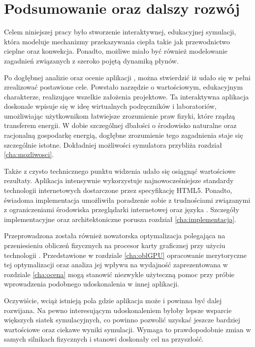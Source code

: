 \chapter{Podsumowanie oraz dalszy rozwój}

Celem niniejszej pracy było stworzenie interaktywnej, edukacyjnej symulacji,
która modeluje mechanizmy przekazywania ciepła takie jak przewodnictwo cieplne
oraz konwekcja. Ponadto, możliwe miało być również modelowanie zagadnień
związanych z szeroko pojętą dynamiką płynów.

Po dogłębnej analizie oraz ocenie aplikacji \en, można stwierdzić iż udało się w
pełni zrealizować postawione cele. Powstało narzędzie o wartościowym,
edukacyjnym charakterze, realizujące wszelkie założenia projektowe. Ta
interaktywna aplikacja doskonale wpisuje się w ideę wirtualnych podręczników i
laboratoriów, umożliwiając użytkownikom łatwiejsze zrozumienie praw fizyki,
które rządzą transferem energii. W dobie szczególnej dbałości o środowisko
naturalne oraz racjonalną gospodarkę energią, dogłębne zrozumienie tego
zagadnienia staje się szczególnie istotne. Dokładniej możliwości symulatora
przybliża rozdział \ref{cha:mozliwosci}.

Także z czysto technicznego punktu widzenia udało się osiągnąć wartościowe
rezultaty. Aplikacja intensywnie wykorzystuje najnowocześniejsze standardy
technologii internetowych dostarczone przez specyfikację HTML5. Ponadto,
świadoma implementacja umożliwiła poradzenie sobie z trudnościami związanymi z
ograniczeniami środowiska przeglądarki internetowej oraz języka \js. Szczegóły
implementacyjne oraz architektoniczne porusza rozdział \ref{cha:implementacja}.

Przeprowadzona została również nowatorska optymalizacja polegająca na
przeniesieniu obliczeń fizycznych na procesor karty graficznej przy użyciu
technologii . Przedstawione w rozdziale \ref{cha:oblGPU} opracowanie
merytoryczne tej optymalizacji oraz analiza jej wpływu na wydajność
zaprezentowana w rozdziale \ref{cha:ocena} mogą stanowić niezwykle użyteczną
pomoc przy próbie wprowadzenia podobnego udoskonalenia w innej aplikacji.

Oczywiście, wciąż istnieją pola gdzie aplikacja może i powinna być dalej
rozwijana. Na pewno interesującym udoskonaleniem byłoby lepsze wsparcie większych
siatek symulacyjnych, co powinno pozwolić uzyskać jeszcze bardziej wartościowe
oraz ciekawe wyniki symulacji. Wymaga to prawdopodobnie zmian w samych
silnikach fizycznych i stanowi doskonały cel na przyszłość.
